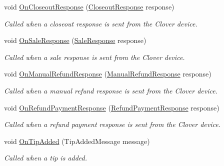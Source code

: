 \begin{DoxyCompactItemize}
void \hyperlink{interfacecom_1_1clover_1_1remotepay_1_1sdk_1_1_i_clover_connector_listener_a8558c8169f271fa5b26994be50464fb6}{On\+Closeout\+Response} (\hyperlink{classcom_1_1clover_1_1remotepay_1_1sdk_1_1_closeout_response}{Closeout\+Response} response)
\begin{DoxyCompactList}\small\item\em Called when a closeout response is sent from the Clover device. \end{DoxyCompactList}\item 
void \hyperlink{interfacecom_1_1clover_1_1remotepay_1_1sdk_1_1_i_clover_connector_listener_a7a3aefe10180145d42d02a6a391b0113}{On\+Sale\+Response} (\hyperlink{classcom_1_1clover_1_1remotepay_1_1sdk_1_1_sale_response}{Sale\+Response} response)
\begin{DoxyCompactList}\small\item\em Called when a sale response is sent from the Clover device. \end{DoxyCompactList}\item 
void \hyperlink{interfacecom_1_1clover_1_1remotepay_1_1sdk_1_1_i_clover_connector_listener_a816b762344c31db77125abe68fe2c125}{On\+Manual\+Refund\+Response} (\hyperlink{classcom_1_1clover_1_1remotepay_1_1sdk_1_1_manual_refund_response}{Manual\+Refund\+Response} response)
\begin{DoxyCompactList}\small\item\em Called when a manual refund response is sent from the Clover device. \end{DoxyCompactList}\item 
void \hyperlink{interfacecom_1_1clover_1_1remotepay_1_1sdk_1_1_i_clover_connector_listener_a587ba1b1dfd1201e9225c7bc6323ad45}{On\+Refund\+Payment\+Response} (\hyperlink{classcom_1_1clover_1_1remotepay_1_1sdk_1_1_refund_payment_response}{Refund\+Payment\+Response} response)
\begin{DoxyCompactList}\small\item\em Called when a refund payment response is sent from the Clover device. \end{DoxyCompactList}\item 
void \hyperlink{interfacecom_1_1clover_1_1remotepay_1_1sdk_1_1_i_clover_connector_listener_a39348a8d97a69efbbdf03e3ccbdced7d}{On\+Tip\+Added} (Tip\+Added\+Message message)
\begin{DoxyCompactList}\small\item\em Called when a tip is added. \end{DoxyCompactList}\item 

\end{DoxyCompactItemize}
